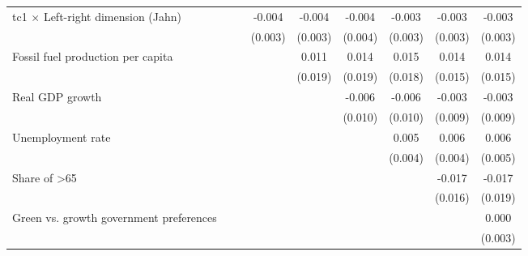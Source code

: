 \begin{table}[htbp]
\begin{tabular}{lcccccccc}
      tc1 $\times$ Left-right dimension (Jahn)  &                &                & -0.004        & -0.004        & -0.004         & -0.003         & -0.003         & -0.003\\   
                                                &                &                & (0.003)       & (0.003)       & (0.004)        & (0.003)        & (0.003)        & (0.003)\\   
      Fossil fuel production per capita         &                &                &               & 0.011         & 0.014          & 0.015          & 0.014          & 0.014\\   
                                                &                &                &               & (0.019)       & (0.019)        & (0.018)        & (0.015)        & (0.015)\\   
      Real GDP growth                           &                &                &               &               & -0.006         & -0.006         & -0.003         & -0.003\\   
                                                &                &                &               &               & (0.010)        & (0.010)        & (0.009)        & (0.009)\\   
      Unemployment rate                         &                &                &               &               &                & 0.005          & 0.006          & 0.006\\   
                                                &                &                &               &               &                & (0.004)        & (0.004)        & (0.005)\\   
      Share of >65                              &                &                &               &               &                &                & -0.017         & -0.017\\   
                                                &                &                &               &               &                &                & (0.016)        & (0.019)\\   
      Green vs. growth government preferences   &                &                &               &               &                &                &                & 0.000\\   
                                                &                &                &               &               &                &                &                & (0.003)\\   

\end{tabular}
\end{table}
